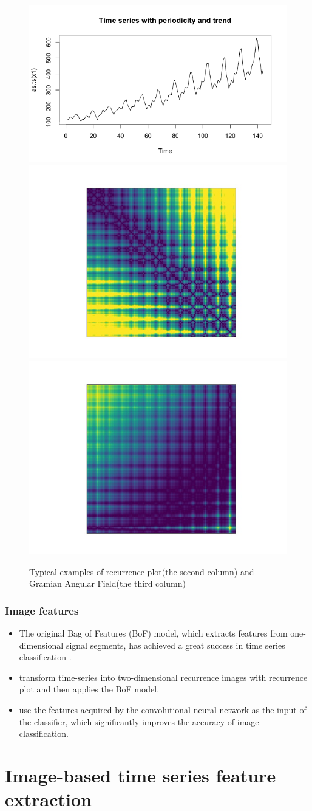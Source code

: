 \documentclass[10pt,aspectratio=43]{beamer}
\begin{document}
\begin{frame}
\begin{figure}[thb]
    \includegraphics[width=0.25\linewidth]{figures/Period_data_with_linear_trend.png}\includegraphics[width=0.25\linewidth]{figures/trend_period_RP.jpg}\includegraphics[width=0.25\linewidth]{figures/trend_period_GAF.jpg}\\
    \caption{Typical examples of recurrence plot(the second column) and Gramian Angular
      Field(the third column)}
  \label{fig:RP-egs}
\end{figure}

\end{frame}

\begin{frame}
  \frametitle{Image features}
  \begin{itemize}
  \item The original Bag of Features (BoF) model, which extracts features from one-dimensional
signal segments, has achieved a great success in time series classification
\citep{baydogan2013bag, wang2013bag}.
\item \citet{hatami2017bag} transform time-series into
two-dimensional recurrence images with recurrence plot \citep{eckmann1987recurrence} and
then applies the BoF model.

\item \citep{Razavian2014CNN} use the features acquired by the convolutional neural
  network as the input of the classifier, which significantly improves the accuracy of
  image classification.
  \end{itemize}
\end{frame}

\section{Image-based time series feature extraction}
\end{document}
